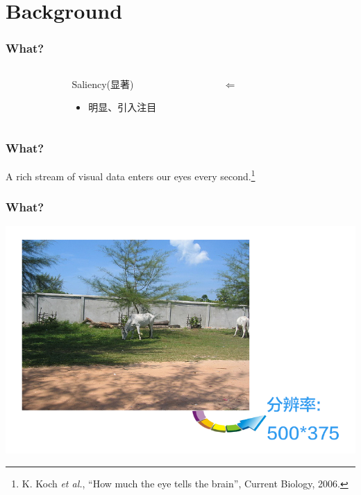 \documentclass[notheorems,serif,table,compress]{beamer}  %
\begin{document}
\section{Background}



\begin{frame}[fragile]
\frametitle{What?}
\begin{columns}
\begin{column}{\leftmargini}
\end{column}
\begin{column}{0.5\linewidth}
\huge{Saliency(显著)}

\begin{itemize}
\item \large{明显、引入注目}
\end{itemize}
\end{column}
\pause
\begin{column}{0.16\linewidth}
\huge $\Longleftarrow$ 
\end{column}
\pause
\begin{column}{0.3\linewidth}
 \centering{\huge \color{blue}{Visual Attention}}
\end{column}
\end{columns}\vspace{1ex}
\end{frame}


\begin{frame}
\frametitle{What?}
  A rich stream of visual data enters our eyes every second.\footnote{K. Koch \textit{et al.}, ``How much the eye tells the brain'', Current Biology, 2006. }\newline
  
  \pause
  \centering{\Huge \color{blue}{$10^8 \sim 10^9 bits$}}
\end{frame}
  
  
\begin{frame}
  \frametitle{What?}
  \begin{center}
  \includegraphics[width=0.85\linewidth]{tuxiang.png}
  \end{center}
  
  \pause
\end{frame}
\end{document}
